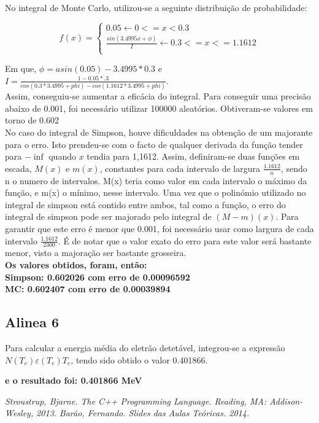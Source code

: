 \documentclass{article}
\begin{document}
\begin{multicols}{2}
  No integral de Monte Carlo, utilizou-se a seguinte distribuição de probabilidade:

  \[
  f(x) =
  \begin{cases}
    0.05 \leftarrow 0 <= x < 0.3\\ 
    \frac{sin(3.4995x + \phi)}{I} \leftarrow 0.3<= x <= 1.1612\\
  \end{cases}\]

  Em que, $\phi = asin(0.05)-3.4995*0.3$ e $I = \frac{1-0.05*.3}{cos(0.3*3.4995+phi)-cos(1.1612*3.4995+phi)}$.\\

  Assim, conseguiu-se aumentar a eficácia do integral. Para conseguir uma precisão abaixo de 0.001, foi necessário utilizar 100000 aleatórios. Obtiveram-se valores em torno de 0.602\\

  No caso do integral de Simpson, houve dificuldades na obtenção de um majorante para o erro. Isto prendeu-se com o facto de qualquer derivada da função tender para $-\inf$ quando $x$ tendia para 1,1612. Assim, definiram-se duas funções em escada, $M(x)$ e $m(x)$, constantes para cada intervalo de largura $\frac{1.1612}{n}$, sendo n o numero de intervalos. M(x) teria como valor em cada intervalo o máximo da função, e m(x) o mínimo, nesse intervalo. Uma vez que o polinómio utilizado no integral de simpson está contido entre ambos, tal como a função, o erro do integral de simpson pode ser majorado pelo integral de $(M-m)(x)$. Para garantir que este erro é menor que 0.001, foi necessário usar como largura de cada intervalo $\frac{1.1612}{2300}$. É de notar que o valor exato do erro para este valor será bastante menor, visto a majoração ser bastante grosseira.\\
\textbf{Os valores obtidos, foram, então:\\
Simpson: 0.602026 com erro de 0.00096592\\
MC: 0.602407 com erro de 0.00039894}\\


  \subsection{Alinea 6}

  Para calcular a energia média do eletrão detetável, integrou-se a expressão $N(T_e)\varepsilon (T_e)T_e$, tendo sido obtido o valor 0.401866.

\textbf{e o resultado foi:
0.401866 MeV}

  \begin{thebibliography}{9}


    \textit{Stroustrup, Bjarne. The C++ Programming Language. Reading, MA: Addison-Wesley, 2013.}
    \textit{Barão, Fernando. Slides das Aulas Teóricas. 2014.}

  \end{thebibliography}
\end{multicols}
\end{document}
